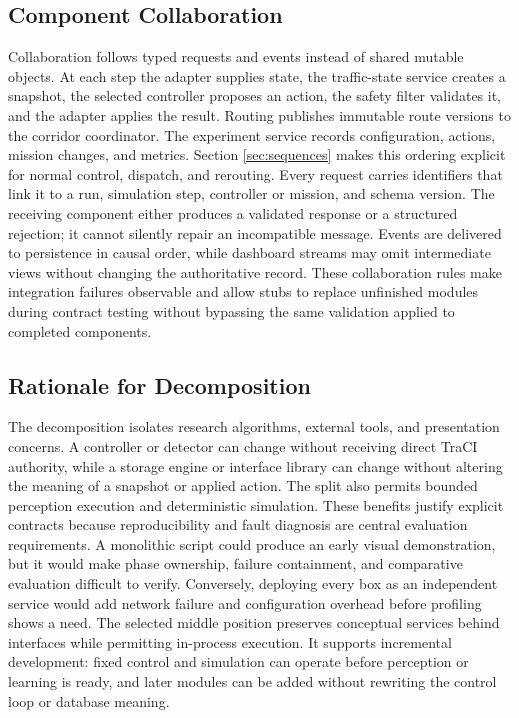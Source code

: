 \subsection{Component Collaboration}

Collaboration follows typed requests and events instead of shared mutable objects. At each step the adapter supplies state, the traffic-state service creates a snapshot, the selected controller proposes an action, the safety filter validates it, and the adapter applies the result. Routing publishes immutable route versions to the corridor coordinator. The experiment service records configuration, actions, mission changes, and metrics. Section \ref{sec:sequences} makes this ordering explicit for normal control, dispatch, and rerouting. Every request carries identifiers that link it to a run, simulation step, controller or mission, and schema version. The receiving component either produces a validated response or a structured rejection; it cannot silently repair an incompatible message. Events are delivered to persistence in causal order, while dashboard streams may omit intermediate views without changing the authoritative record. These collaboration rules make integration failures observable and allow stubs to replace unfinished modules during contract testing without bypassing the same validation applied to completed components.

\subsection{Rationale for Decomposition}

The decomposition isolates research algorithms, external tools, and presentation concerns. A controller or detector can change without receiving direct TraCI authority, while a storage engine or interface library can change without altering the meaning of a snapshot or applied action. The split also permits bounded perception execution and deterministic simulation. These benefits justify explicit contracts because reproducibility and fault diagnosis are central evaluation requirements. A monolithic script could produce an early visual demonstration, but it would make phase ownership, failure containment, and comparative evaluation difficult to verify. Conversely, deploying every box as an independent service would add network failure and configuration overhead before profiling shows a need. The selected middle position preserves conceptual services behind interfaces while permitting in-process execution. It supports incremental development: fixed control and simulation can operate before perception or learning is ready, and later modules can be added without rewriting the control loop or database meaning.

